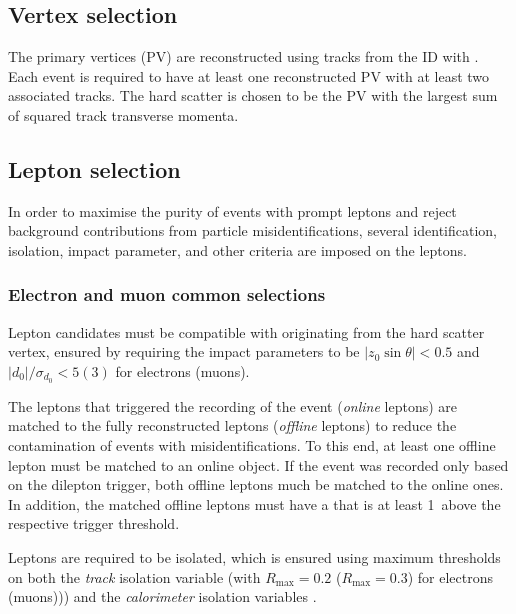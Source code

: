 \subsection{Vertex selection}
The primary vertices (PV) are reconstructed using tracks from the ID with \MeV. Each event is required to have at least one reconstructed PV with at least two associated tracks. The hard scatter is chosen to be the PV with the largest sum of squared track transverse momenta.


\subsection{Lepton selection}
In order to maximise the purity of events with prompt leptons and reject background contributions from particle misidentifications, several identification, isolation, impact parameter, and other criteria are imposed on the leptons.

\subsubsection{Electron and muon common selections}
Lepton candidates must be compatible with originating from the hard scatter vertex, ensured by requiring the impact parameters to be $|z_0\sin\theta|<0.5$ and $|d_0| / \sigma_{d_0} < 5 (3)$ for electrons (muons).

The leptons that triggered the recording of the event (\emph{online} leptons) are matched to the fully reconstructed leptons (\emph{offline} leptons) to reduce the contamination of events with misidentifications.
To this end, at least one offline lepton must be matched to an online object.
If the event was recorded only based on the dilepton trigger, both offline leptons much be matched to the online ones.
In addition, the matched offline leptons must have a \pT that is at least 1\GeV\ above the respective trigger threshold.

Leptons are required to be isolated, which is ensured using maximum thresholds on both the \emph{track} isolation variable \pTvarcone (with $R_{\text{max}} = 0.2$ ($R_{\text{max}} = 0.3$) for electrons (muons))) and the \emph{calorimeter} isolation variables \ETconetwenty.

